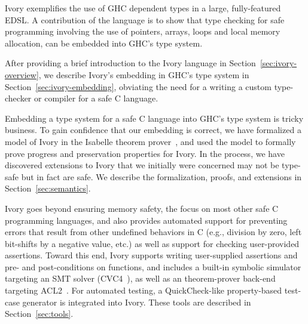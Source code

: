 Ivory exemplifies the use of GHC dependent types in a large, fully-featured
EDSL. A contribution of the language is to show that type checking for safe
programming involving the use of pointers, arrays, loops and local memory
allocation, can be embedded into GHC's type system.

After providing a brief introduction to the Ivory language in
Section~\ref{sec:ivory-overview}, we describe Ivory's embedding in GHC's type
system in Section~\ref{sec:ivory-embedding}, obviating the need for a writing a
custom type-checker or compiler for a safe C language.

Embedding a type system for a safe C language into GHC's type system is tricky
business. To gain confidence that our embedding is correct, we have formalized a
model of Ivory in the Isabelle theorem prover~\cite{}, and used the model to
formally prove progress and preservation properties for Ivory. In the process,
we have discovered extensions to Ivory that we initially were concerned may not
be type-safe but in fact are safe. We describe the formalization, proofs, and
extensions in Section~\ref{sec:semantics}.

Ivory goes beyond ensuring memory safety, the focus on most other safe C
programming languages, and also provides automated support for preventing errors
that result from other undefined behaviors in C (e.g., division by zero, left
bit-shifts by a negative value, etc.) as well as support for checking
user-provided assertions. Toward this end, Ivory supports writing user-supplied
assertions and pre- and post-conditions on functions, and includes a built-in
symbolic simulator targeting an SMT solver (CVC4~\cite{}), as well as an
theorem-prover back-end targeting ACL2~\cite{}. For automated testing, a
QuickCheck-like property-based test-case generator is integrated into
Ivory. These tools are described in Section~\ref{sec:tools}.

